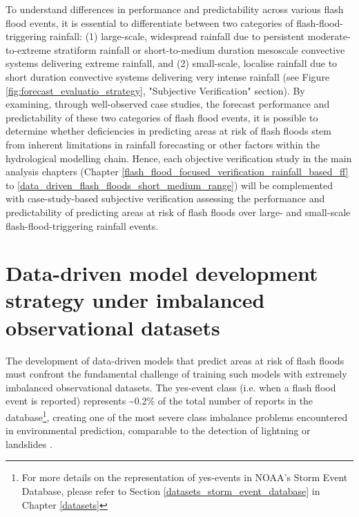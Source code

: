 \begin{figure}[htbp]
\label{fig:curve_roc_pr_examples}
\end{figure}

To  understand differences in performance and predictability across various flash flood events, it is essential to differentiate between two categories of flash-flood-triggering rainfall: (1) large-scale, widespread rainfall due to persistent moderate-to-extreme stratiform rainfall or short-to-medium duration mesoscale convective systems delivering extreme rainfall, and (2) small-scale, localise rainfall due to short duration convective systems delivering very intense rainfall (see Figure \ref{fig:forecast_evaluatio_strategy}, "Subjective Verification" section). By examining, through well-observed case studies, the forecast performance and predictability of these two categories of flash flood events, it is possible to determine whether deficiencies in predicting areas at risk of flash floods stem from inherent limitations in rainfall forecasting or other factors within the hydrological modelling chain. Hence, each objective verification study in the main analysis chapters (Chapter \ref{flash_flood_focused_verification_rainfall_based_ff} to \ref{data_driven_flash_floods_short_medium_range}) will be complemented with case-study-based subjective verification assessing the performance and predictability of predicting areas at risk of flash floods over large- and small-scale flash-flood-triggering rainfall events.


\section{Data-driven model development strategy 
under imbalanced observational datasets}
\label{integrated_experimental_strategy_model_development_imbalanced_data}

The development of data-driven models that predict areas at risk of flash floods must confront the fundamental challenge of training such models with extremely imbalanced observational datasets. The yes-event class (i.e. when a flash flood event is reported) represents \sim0.2\% of the total number of reports in the database\footnote{For more details on the representation of yes-events in NOAA's Storm Event Database, please refer to Section \ref{datasets_storm_event_database} in Chapter \ref{datasets}}, creating one of the most severe class imbalance problems encountered in environmental prediction, comparable to the detection of lightning \citep{Cavaiola_2024} or landslides \citep{Xu_2022, Agrawal_2017, Zhang_2022, Gupta_2023}. 

